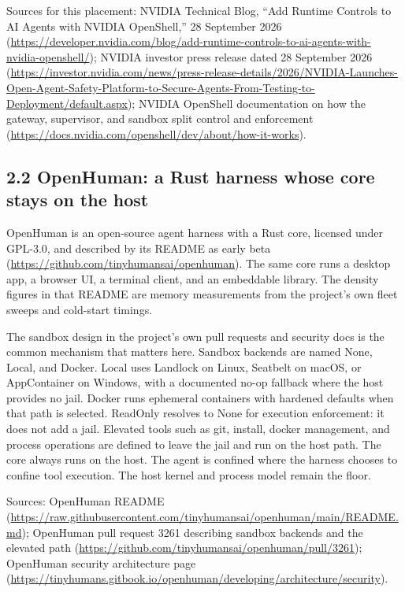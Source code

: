 \documentclass[10pt,letterpaper]{article}
\begin{document}
Sources for this placement: NVIDIA Technical Blog, ``Add Runtime
Controls to AI Agents with NVIDIA OpenShell,'' 28 September 2026
(\url{https://developer.nvidia.com/blog/add-runtime-controls-to-ai-agents-with-nvidia-openshell/});
NVIDIA investor press release dated 28 September 2026
(\url{https://investor.nvidia.com/news/press-release-details/2026/NVIDIA-Launches-Open-Agent-Safety-Platform-to-Secure-Agents-From-Testing-to-Deployment/default.aspx});
NVIDIA OpenShell documentation on how the gateway, supervisor, and
sandbox split control and enforcement
(\url{https://docs.nvidia.com/openshell/dev/about/how-it-works}).

\subsection{2.2 OpenHuman: a Rust harness whose core stays on the
host}\label{openhuman-a-rust-harness-whose-core-stays-on-the-host}

OpenHuman is an open-source agent harness with a Rust core, licensed
under GPL-3.0, and described by its README as early beta
(\url{https://github.com/tinyhumansai/openhuman}). The same core runs a
desktop app, a browser UI, a terminal client, and an embeddable library.
The density figures in that README are memory measurements from the
project's own fleet sweeps and cold-start timings.

The sandbox design in the project's own pull requests and security docs
is the common mechanism that matters here. Sandbox backends are named
None, Local, and Docker. Local uses Landlock on Linux, Seatbelt on
macOS, or AppContainer on Windows, with a documented no-op fallback
where the host provides no jail. Docker runs ephemeral containers with
hardened defaults when that path is selected. ReadOnly resolves to None
for execution enforcement: it does not add a jail. Elevated tools such
as git, install, docker management, and process operations are defined
to leave the jail and run on the host path. The core always runs on the
host. The agent is confined where the harness chooses to confine tool
execution. The host kernel and process model remain the floor.

Sources: OpenHuman README
(\url{https://raw.githubusercontent.com/tinyhumansai/openhuman/main/README.md});
OpenHuman pull request 3261 describing sandbox backends and the elevated
path (\url{https://github.com/tinyhumansai/openhuman/pull/3261});
OpenHuman security architecture page
(\url{https://tinyhumans.gitbook.io/openhuman/developing/architecture/security}).
\end{document}
